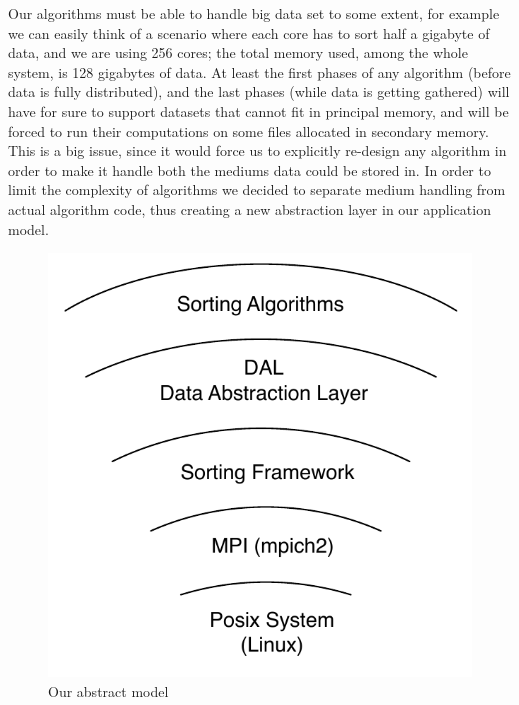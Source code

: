 Our algorithms must be able to handle big data set to some extent, for example we can easily think of a scenario where each core has to sort half a gigabyte of data, and we are using 256 cores; the total memory used, among the whole system, is 128 gigabytes of data.
At least the first phases of any algorithm (before data is fully distributed), and the last phases (while data is getting gathered) will have for sure to support datasets that cannot fit in principal memory, and will be forced to run their computations on some files allocated in secondary memory.
This is a big issue, since it would force us to explicitly re-design any algorithm in order to make it handle both the mediums data could be stored in.
In order to limit the complexity of algorithms we decided to separate medium handling from actual algorithm code, thus creating a new abstraction layer in our application model.

\begin{figure}
  \begin{center}
    \includegraphics[scale=0.50]{levels}
  \end{center}
  \caption{Our abstract model}
\end{figure}

